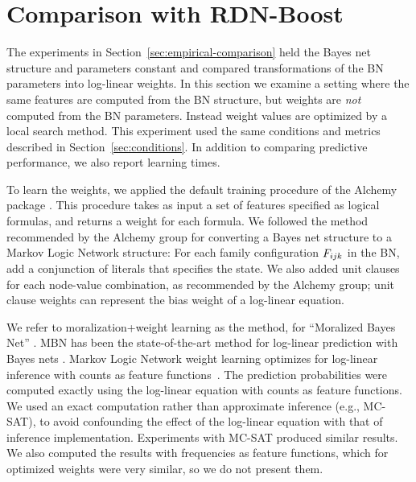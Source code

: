 \documentclass[runningheads,a4paper]{llncs}
\begin{document}
\section{Comparison with RDN-Boost}
\label{sec:general-weights}

The experiments in Section~\ref{sec:empirical-comparison} held the Bayes net structure and parameters constant and compared transformations of the BN parameters into log-linear weights. In this section we examine a setting where the same features are computed from the BN structure, but weights are {\em not} computed from the BN parameters. Instead weight values are optimized by a local search method. This experiment used the same conditions and metrics described in Section~\ref{sec:conditions}.  In addition to comparing predictive performance, we also report learning times.

To learn the weights, we applied the default training procedure of the Alchemy package \cite{Kok2009a}.  This procedure takes as input a set of features specified as logical formulas, and returns a weight for each formula. We followed the method recommended by the Alchemy group \cite{bib:bayes-convert} for converting a Bayes net structure to a Markov Logic Network structure: For each family configuration $F_{ijk}$ in the BN, add a conjunction of literals that specifies the state. We also added unit clauses for each node-value combination, as recommended by the Alchemy group; unit clause weights can represent the bias weight of a log-linear equation.


We refer to moralization+weight learning as the  method, for ``Moralized Bayes Net''   \cite{Khosravi2010}. 
MBN has been the state-of-the-art method for log-linear prediction with Bayes nets \cite{Schulte2012}.
Markov Logic Network weight learning optimizes for log-linear inference with counts as feature functions~\cite{Schulte2011}. The prediction probabilities were computed exactly using the log-linear equation with counts as feature functions. We used an exact computation rather than approximate inference
(e.g., MC-SAT), to avoid confounding the effect of the log-linear equation with that of inference implementation. Experiments with MC-SAT produced similar results. We also computed the results with frequencies as feature functions, which for optimized weights were very similar, so we do not present them. 
\end{document}
